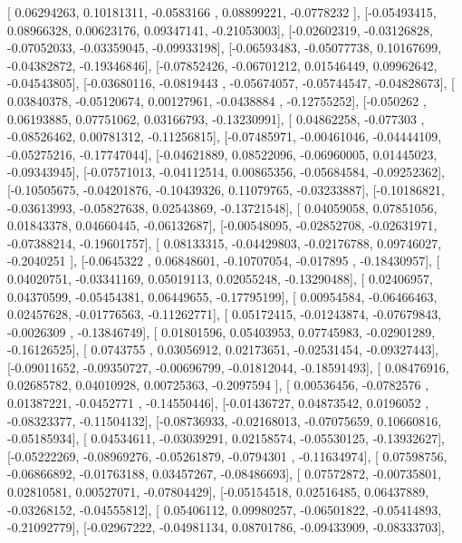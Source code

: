 \documentclass{article}
\begin{document}
       [ 0.06294263,  0.10181311, -0.0583166 ,  0.08899221, -0.0778232 ],
       [-0.05493415,  0.08966328,  0.00623176,  0.09347141, -0.21053003],
       [-0.02602319, -0.03126828, -0.07052033, -0.03359045, -0.09933198],
       [-0.06593483, -0.05077738,  0.10167699, -0.04382872, -0.19346846],
       [-0.07852426, -0.06701212,  0.01546449,  0.09962642, -0.04543805],
       [-0.03680116, -0.0819443 , -0.05674057, -0.05744547, -0.04828673],
       [ 0.03840378, -0.05120674,  0.00127961, -0.0438884 , -0.12755252],
       [-0.050262  ,  0.06193885,  0.07751062,  0.03166793, -0.13230991],
       [ 0.04862258, -0.077303  , -0.08526462,  0.00781312, -0.11256815],
       [-0.07485971, -0.00461046, -0.04444109, -0.05275216, -0.17747044],
       [-0.04621889,  0.08522096, -0.06960005,  0.01445023, -0.09343945],
       [-0.07571013, -0.04112514,  0.00865356, -0.05684584, -0.09252362],
       [-0.10505675, -0.04201876, -0.10439326,  0.11079765, -0.03233887],
       [-0.10186821, -0.03613993, -0.05827638,  0.02543869, -0.13721548],
       [ 0.04059058,  0.07851056,  0.01843378,  0.04660445, -0.06132687],
       [-0.00548095, -0.02852708, -0.02631971, -0.07388214, -0.19601757],
       [ 0.08133315, -0.04429803, -0.02176788,  0.09746027, -0.2040251 ],
       [-0.0645322 ,  0.06848601, -0.10707054, -0.017895  , -0.18430957],
       [ 0.04020751, -0.03341169,  0.05019113,  0.02055248, -0.13290488],
       [ 0.02406957,  0.04370599, -0.05454381,  0.06449655, -0.17795199],
       [ 0.00954584, -0.06466463,  0.02457628, -0.01776563, -0.11262771],
       [ 0.05172415, -0.01243874, -0.07679843, -0.0026309 , -0.13846749],
       [ 0.01801596,  0.05403953,  0.07745983, -0.02901289, -0.16126525],
       [ 0.0743755 ,  0.03056912,  0.02173651, -0.02531454, -0.09327443],
       [-0.09011652, -0.09350727, -0.00696799, -0.01812044, -0.18591493],
       [ 0.08476916,  0.02685782,  0.04010928,  0.00725363, -0.2097594 ],
       [ 0.00536456, -0.0782576 ,  0.01387221, -0.0452771 , -0.14550446],
       [-0.01436727,  0.04873542,  0.0196052 , -0.08323377, -0.11504132],
       [-0.08736933, -0.02168013, -0.07075659,  0.10660816, -0.05185934],
       [ 0.04534611, -0.03039291,  0.02158574, -0.05530125, -0.13932627],
       [-0.05222269, -0.08969276, -0.05261879, -0.0794301 , -0.11634974],
       [ 0.07598756, -0.06866892, -0.01763188,  0.03457267, -0.08486693],
       [ 0.07572872, -0.00735801,  0.02810581,  0.00527071, -0.07804429],
       [-0.05154518,  0.02516485,  0.06437889, -0.03268152, -0.04555812],
       [ 0.05406112,  0.09980257, -0.06501822, -0.05414893, -0.21092779],
       [-0.02967222, -0.04981134,  0.08701786, -0.09433909, -0.08333703],
\end{document}
